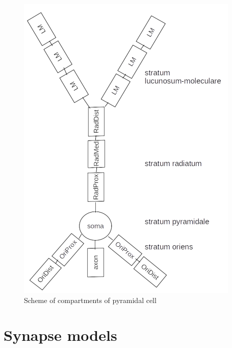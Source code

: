 \documentclass[a4paper,12pt]{article}
\begin{document}
\begin{figure}[h]
	\centering
\includegraphics{pyramide_structures.png}
\caption{Scheme of compartments of pyramidal cell}
\label{fig:pyr_structures}
\end{figure}

\section{Synapse models} 
\end{document}
